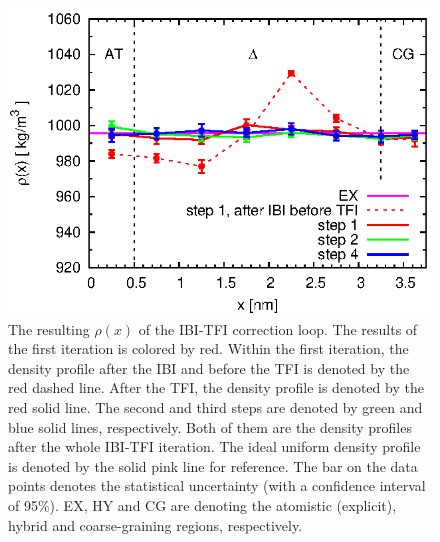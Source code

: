 \documentclass[aps,pre,preprint,unsortedaddress]{revtex4}
\begin{document}
\begin{figure}
  \centering
  \includegraphics{fig.3/rho.eps}
  \caption{The resulting $\rho(x)$ of the IBI-TFI correction loop.
    The results of the first iteration is colored by red. Within the
    first iteration, the density profile after the IBI and before the
    TFI is denoted by the  red dashed line.  After the TFI, the density
    profile is denoted by the  red solid line.  The second and third
    steps are denoted by green and blue solid lines,
    respectively. Both of them are the density profiles after the
    whole IBI-TFI iteration. The ideal uniform density profile is
    denoted by the solid pink line for reference. The bar on the data
    points denotes the statistical uncertainty (with a confidence
    interval of 95\%). EX, HY and CG are denoting the atomistic
    (explicit), hybrid and coarse-graining regions, respectively. }
  \label{fig:tmp3}
\end{figure}
\end{document}
